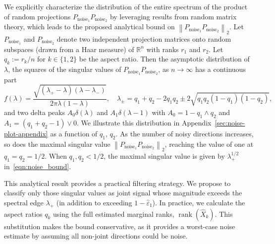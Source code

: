 \documentclass{amsart}
\def\R{\mathbb{R}} %
\DeclareMathOperator*{\rank}{rank}
\begin{document}
We explicitly characterize the distribution of the entire spectrum of the product of random projections $P_{\text{noise}_1}P_{\text{noise}_2}$ by leveraging results from random matrix theory, which leads to the proposed analytical bound on $\left\|P_{\text{noise}_1}P_{\text{noise}_2}\right\|_2$. Let $P_{\text{noise}_1}$ and $P_{\text{noise}_2}$ denote two independent projection matrices onto random subspaces (drawn from a Haar measure) of $\R^n$ with ranks $r_1$ and $r_2$. Let  $q_k := r_k/n$ for $k\in \{1,2\}$ be the aspect ratio. Then the asymptotic distribution of $\lambda$, the squares of the singular values of $P_{\text{noise}_1}P_{\text{noise}_2}$, as $n\to \infty$ \citep{bouchaud2007large} has a continuous part 
\begin{equation}
f(\lambda) = \frac{\sqrt{(\lambda_+ - \lambda)(\lambda - \lambda_-)}}{2\pi\lambda(1-\lambda)}, \quad 
\lambda_{\pm} = q_1 + q_2 - 2q_1q_2 \pm 2\sqrt{q_1q_2(1-q_1)(1-q_2)},
\label{eqn:noise_bound}
\end{equation}
and two delta peaks $A_0\delta(\lambda)$ and $A_1\delta(\lambda-1)$ with $A_0 =  1 - q_1 \wedge q_2$ and $A_1 = (q_1 + q_2 -1) \vee 0$. We illustrate this distribution in Appendix~\ref{sec:noise-plot-appendix} as a function of $q_1$, $q_2$. As the number of noisy directions increases, so does the maximal singular value $\left\|P_{\text{noise}_1}P_{\text{noise}_2}\right\|_2$, reaching the value of one at $q_1=q_2=1/2$. When $q_1, q_2 < 1/2$, the maximal singular value is given by $\lambda_+^{1/2}$ in~\eqref{eqn:noise_bound}. 

{
This analytical result provides a practical filtering strategy. We propose to classify only those singular values as joint signal whose magnitude exceeds the spectral edge $\lambda_+$ (in addition to exceeding $1-\widehat \varepsilon_1$). In practice, we calculate the aspect ratios $q_k$ using the full estimated marginal ranks, $\rank(\widehat{X}_k)$. This substitution makes the bound conservative, as it provides a worst-case noise estimate by assuming all non-joint directions could be noise.

}
\end{document}
